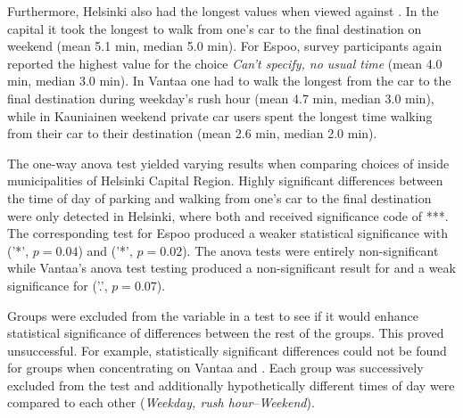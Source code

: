 Furthermore, Helsinki also had the longest  values when viewed against . In the capital it took the longest to walk from one's car to the final destination on weekend (mean 5.1 min, median 5.0 min). For Espoo, survey participants again reported the highest  value for the choice \textit{Can't specify, no usual time} (mean 4.0 min, median 3.0 min). In Vantaa one had to walk the longest from the car to the final destination during weekday's rush hour (mean 4.7 min, median 3.0 min), while in Kauniainen weekend private car users spent the longest time walking from their car to their destination (mean 2.6 min, median 2.0 min).

The one-way \acrshort{anova} test yielded varying results when comparing choices of  inside municipalities of Helsinki Capital Region. Highly significant differences between the time of day of parking and walking from one's car to the final destination were only detected in Helsinki, where both  and  received significance code of ***. The corresponding test for Espoo produced a weaker statistical significance with  ('*', $p = 0.04$) and  ('*', $p = 0.02$). The \acrshort{anova} tests were entirely non-significant while Vantaa's \acrshort{anova} test testing  produced a non-significant result for  and a weak significance for  ('.', $p = 0.07$).

Groups were excluded from the variable  in a test to see if it would enhance statistical significance of differences between the rest of the groups. This proved unsuccessful. For example, statistically significant differences could not be found for  groups when concentrating on Vantaa and . Each group was successively excluded from the test and additionally hypothetically different times of day were compared to each other (\textit{Weekday, rush hour}--\textit{Weekend}).

